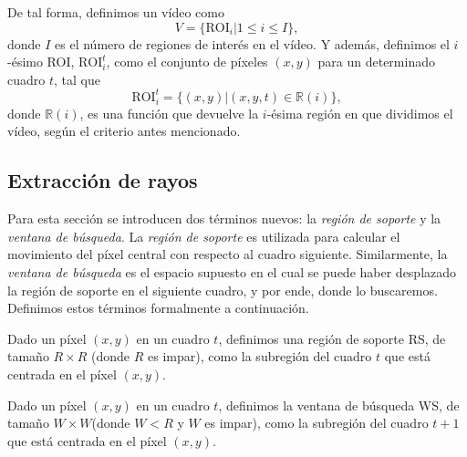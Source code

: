 	De tal forma, definimos un vídeo como 
	\begin{equation}\label{algoritmo:eq:video}		
		V = \{\text{ROI}_i | 1 \leq i \le I\}, 
	\end{equation}
	donde $I$ es el número de regiones de interés en el vídeo. Y además, definimos el $i$-ésimo ROI, $\text{ROI}_i^t$, como el conjunto de píxeles $(x,y)$ para un determinado cuadro $t$, tal que
	\begin{equation}\label{algoritmo:eq:roi}
		\text{ROI}_{i}^{t} = \{(x,y) | (x,y,t) \in \mathds{R}(i)\},
	\end{equation}
	donde $\mathds{R}(i)$, es una función que devuelve la $i$-ésima región en que dividimos el vídeo, según el criterio antes mencionado.

	\subsection{Extracción de rayos}
	\label{algoritmo:ext_rayos}
	
	Para esta sección se introducen dos términos nuevos: la \textit{región de soporte} y la \textit{ventana de búsqueda}. La \textit{región de soporte} es utilizada para calcular el movimiento del píxel central con respecto al cuadro siguiente. Similarmente, la \textit{ventana de búsqueda} es el espacio supuesto en el cual se puede haber desplazado la región de soporte en el siguiente cuadro, y por ende, donde lo buscaremos. Definimos estos términos formalmente a continuación.
	
	\begin{definition}	
  Dado un píxel $(x,y)$ en un cuadro $t$, definimos una región de soporte RS, de tamaño $R \times R$ (donde $R$ es impar), como la subregión del cuadro $t$ que está centrada en el píxel $(x,y)$.
	\end{definition}

	\begin{definition}
	Dado un píxel $(x,y)$ en un cuadro $t$, definimos la ventana de búsqueda WS, de  tamaño $W \times W$(donde $W < R$ y $W$ es impar), como la subregión del cuadro $t+1$ que está centrada en el píxel $(x,y)$.
	\end{definition}
		
